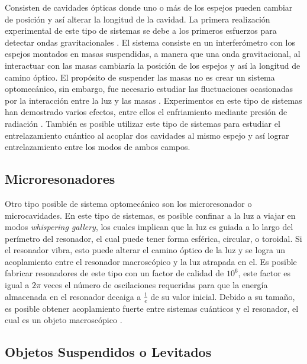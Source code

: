 \documentclass[10pt,a4paper]{report}
\begin{document}
Consisten de cavidades ópticas donde uno o más de los
espejos pueden cambiar de posición y así alterar la longitud de la
cavidad. La primera realización experimental de este tipo de sistemas
se debe a los primeros esfuerzos para detectar ondas gravitacionales
\cite{AbramoviciLIGO}. El sistema consiste en un interferómetro con
los espejos montados en masas suspendidas, a manera que una onda
gravitacional, al interactuar con las masas cambiaría la posición de
los espejos y así la longitud de camino óptico. El propósito de
suspender las masas no es crear un sistema optomecánico, sin embargo, fue necesario estudiar las fluctuaciones ocasionadas por la interacción entre la luz y las masas \cite{CavesIF}.
Experimentos en este tipo de sistemas han demostrado varios efectos,
entre ellos el enfriamiento mediante presión de radiación
\cite{CorbittOC}. También es posible utilizar este tipo de sistemas
para estudiar el entrelazamiento cuántico\cite{ChenED} al acoplar dos
cavidades al mismo espejo y así lograr entrelazamiento entre los modos
de ambos campos.

\subsection{Microresonadores}

Otro tipo posible de sistema optomecánico son los
microresonador o microcavidades. En este tipo de sistemas, es posible
confinar a la luz a viajar en modos \textit{whispering gallery}, los
cuales implican que la luz es guiada a lo largo del perímetro del
resonador, el cual puede tener forma esférica, circular, o
toroidal\cite{VahalaOM}. Si el resonador vibra, esto puede alterar el camino óptico de la luz y
se logra un acoplamiento entre el resonador macroscópico y la luz atrapada en el. Es posible fabricar resonadores de este tipo con un factor de calidad de $10^6$, este factor es igual a $2\pi$ veces el número de oscilaciones requeridas para que la energía almacenada en el resonador decaiga a $\frac{1}{e}$ de su valor inicial. Debido a su tamaño, es posible obtener acoplamiento fuerte entre sistemas cuánticos y el
resonador, el cual es un objeto macroscópico \cite{VerhagenMOC}.

\subsection{Objetos Suspendidos o Levitados}
\end{document}
